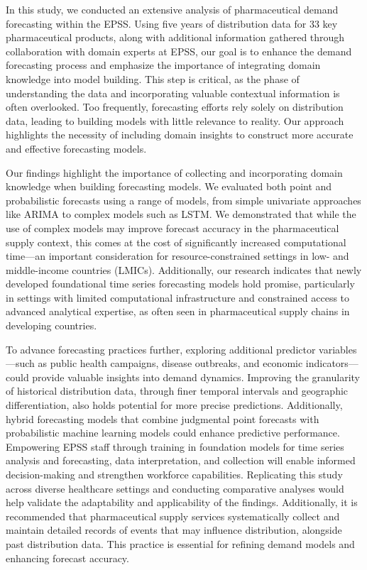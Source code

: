 \documentclass[
  authoryear,
  preprint,
  3p]{elsarticle}
\begin{document}
In this study, we conducted an extensive analysis of pharmaceutical
demand forecasting within the EPSS. Using five years of distribution
data for 33 key pharmaceutical products, along with additional
information gathered through collaboration with domain experts at EPSS,
our goal is to enhance the demand forecasting process and emphasize the
importance of integrating domain knowledge into model building. This
step is critical, as the phase of understanding the data and
incorporating valuable contextual information is often overlooked. Too
frequently, forecasting efforts rely solely on distribution data,
leading to building models with little relevance to reality. Our
approach highlights the necessity of including domain insights to
construct more accurate and effective forecasting models.

Our findings highlight the importance of collecting and incorporating
domain knowledge when building forecasting models. We evaluated both
point and probabilistic forecasts using a range of models, from simple
univariate approaches like ARIMA to complex models such as LSTM. We
demonstrated that while the use of complex models may improve forecast
accuracy in the pharmaceutical supply context, this comes at the cost of
significantly increased computational time---an important consideration
for resource-constrained settings in low- and middle-income countries
(LMICs). Additionally, our research indicates that newly developed
foundational time series forecasting models hold promise, particularly
in settings with limited computational infrastructure and constrained
access to advanced analytical expertise, as often seen in pharmaceutical
supply chains in developing countries.

To advance forecasting practices further, exploring additional predictor
variables---such as public health campaigns, disease outbreaks, and
economic indicators---could provide valuable insights into demand
dynamics. Improving the granularity of historical distribution data,
through finer temporal intervals and geographic differentiation, also
holds potential for more precise predictions. Additionally, hybrid
forecasting models that combine judgmental point forecasts with
probabilistic machine learning models could enhance predictive
performance. Empowering EPSS staff through training in foundation models
for time series analysis and forecasting, data interpretation, and
collection will enable informed decision-making and strengthen workforce
capabilities. Replicating this study across diverse healthcare settings
and conducting comparative analyses would help validate the adaptability
and applicability of the findings. Additionally, it is recommended that
pharmaceutical supply services systematically collect and maintain
detailed records of events that may influence distribution, alongside
past distribution data. This practice is essential for refining demand
models and enhancing forecast accuracy.
\end{document}
